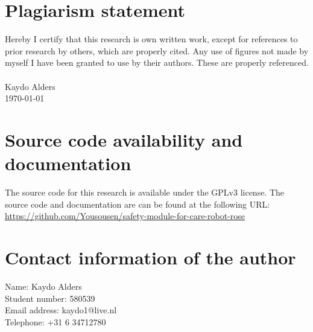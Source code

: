 \documentclass[12pt]{scrreprt}
\begin{document}
\begin{titlepage}
\vfill %
\end{titlepage}

%
%
%
%
%
%

\newpage
\mbox{}
\vfill
\section*{Plagiarism statement}
Hereby I certify that this research is own written work, except for references to prior research by others, which are properly cited. Any use of figures not made by myself I have been granted to use by their authors. These are properly referenced.\\\\
Kaydo Alders\\
\today

\section*{Source code availability and documentation}
The source code for this research is available under the GPLv3 license. The source code and documentation are can be found at the following URL: \href{https://github.com/Yousousen/safety-module-for-care-robot-rose}{https://github.com/Yousousen/safety-module-for-care-robot-rose}

\section*{Contact information of the author}
Name: Kaydo Alders\\
Student number: 580539\\
Email address: kaydo1@live.nl\\
Telephone: +31 6 34712780\\
\end{document}
